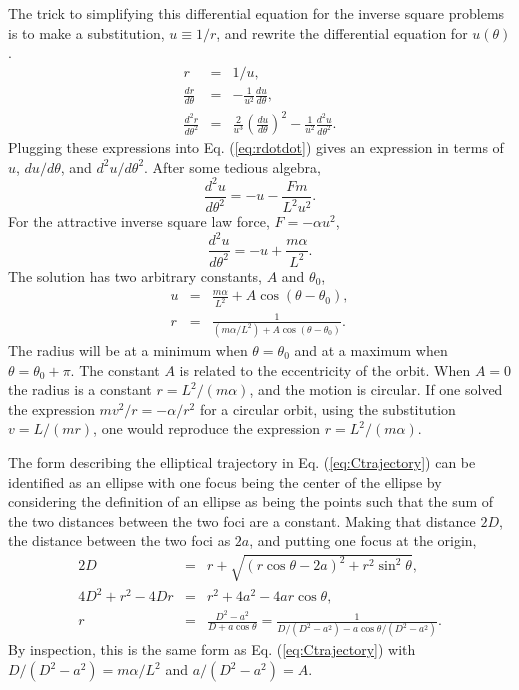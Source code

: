 The trick to simplifying this differential equation for the inverse square problems is to make a substitution, $u\equiv 1/r$, and rewrite the differential equation for $u(\theta)$.
\begin{eqnarray}
r&=&1/u,\\
\nonumber
\frac{dr}{d\theta}&=&-\frac{1}{u^2}\frac{du}{d\theta},\\
\nonumber
\frac{d^2r}{d\theta^2}&=&\frac{2}{u^3}\left(\frac{du}{d\theta}\right)^2-\frac{1}{u^2}\frac{d^2u}{d\theta^2}.
\end{eqnarray}
Plugging these expressions into Eq. (\ref{eq:rdotdot}) gives an expression in terms of $u$, $du/d\theta$, and $d^2u/d\theta^2$. After some tedious algebra,
\begin{equation}
\frac{d^2u}{d\theta^2}=-u-\frac{F m}{L^2u^2}.
\end{equation}
For the attractive inverse square law force, $F=-\alpha u^2$,
\begin{equation}
\frac{d^2u}{d\theta^2}=-u+\frac{m\alpha}{L^2}.
\end{equation}
The solution has two arbitrary constants, $A$ and $\theta_0$,
\begin{eqnarray}
\label{eq:Ctrajectory}
u&=&\frac{m\alpha}{L^2}+A\cos(\theta-\theta_0),\\
\nonumber
r&=&\frac{1}{(m\alpha/L^2)+A\cos(\theta-\theta_0)}.
\end{eqnarray}
The radius will be at a minimum when $\theta=\theta_0$ and at a maximum when $\theta=\theta_0+\pi$. The constant $A$ is related to the eccentricity of the orbit. When $A=0$ the radius is a constant $r=L^2/(m\alpha)$, and the motion is circular. If one solved the expression $mv^2/r=-\alpha/r^2$ for a circular orbit, using the substitution $v=L/(mr)$, one would reproduce the expression $r=L^2/(m\alpha)$.

The form describing the elliptical trajectory in Eq. (\ref{eq:Ctrajectory}) can be identified as an ellipse with one focus being the center of the ellipse by considering the definition of an ellipse as being the points such that the sum of the two distances between the two foci are a constant. Making that distance $2D$, the distance between the two foci as $2a$, and putting one focus at the origin,
\begin{eqnarray}
2D&=&r+\sqrt{(r\cos\theta-2a)^2+r^2\sin^2\theta},\\
\nonumber
4D^2+r^2-4Dr&=&r^2+4a^2-4ar\cos\theta,\\
\nonumber
r&=&\frac{D^2-a^2}{D+a\cos\theta}=\frac{1}{D/(D^2-a^2)-a\cos\theta/(D^2-a^2)}.
\end{eqnarray}
By inspection, this is the same form as Eq. (\ref{eq:Ctrajectory}) with $D/(D^2-a^2)=m\alpha/L^2$ and $a/(D^2-a^2)=A$.

